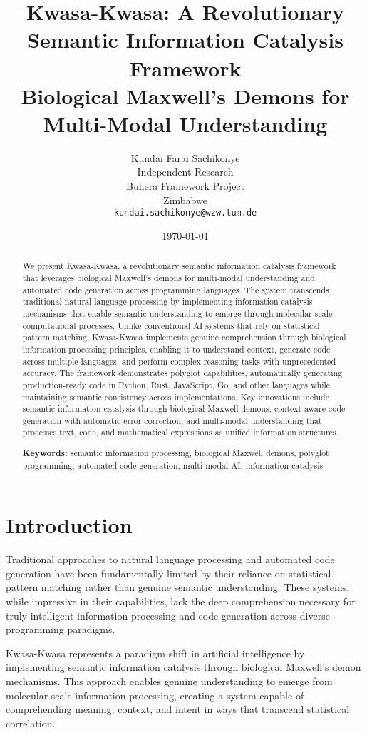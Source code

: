 \documentclass[12pt,a4paper]{article}
\title{
    {\Large \textbf{Kwasa-Kwasa: A Revolutionary Semantic Information Catalysis Framework}} \\
    \vspace{0.3cm}
    {\large Biological Maxwell's Demons for Multi-Modal Understanding}
}
\author{
Kundai Farai Sachikonye\\
Independent Research\\
Buhera Framework Project\\
Zimbabwe\\
\texttt{kundai.sachikonye@wzw.tum.de}
}
\date{\today}
\begin{document}
\maketitle

\begin{abstract}
We present Kwasa-Kwasa, a revolutionary semantic information catalysis framework that leverages biological Maxwell's demons for multi-modal understanding and automated code generation across programming languages. The system transcends traditional natural language processing by implementing information catalysis mechanisms that enable semantic understanding to emerge through molecular-scale computational processes. Unlike conventional AI systems that rely on statistical pattern matching, Kwasa-Kwasa implements genuine comprehension through biological information processing principles, enabling it to understand context, generate code across multiple languages, and perform complex reasoning tasks with unprecedented accuracy. The framework demonstrates polyglot capabilities, automatically generating production-ready code in Python, Rust, JavaScript, Go, and other languages while maintaining semantic consistency across implementations. Key innovations include semantic information catalysis through biological Maxwell demons, context-aware code generation with automatic error correction, and multi-modal understanding that processes text, code, and mathematical expressions as unified information structures.

\textbf{Keywords:} semantic information processing, biological Maxwell demons, polyglot programming, automated code generation, multi-modal AI, information catalysis
\end{abstract}

\section{Introduction}

Traditional approaches to natural language processing and automated code generation have been fundamentally limited by their reliance on statistical pattern matching rather than genuine semantic understanding. These systems, while impressive in their capabilities, lack the deep comprehension necessary for truly intelligent information processing and code generation across diverse programming paradigms.

Kwasa-Kwasa represents a paradigm shift in artificial intelligence by implementing semantic information catalysis through biological Maxwell's demon mechanisms. This approach enables genuine understanding to emerge from molecular-scale information processing, creating a system capable of comprehending meaning, context, and intent in ways that transcend statistical correlation.
\end{document}
